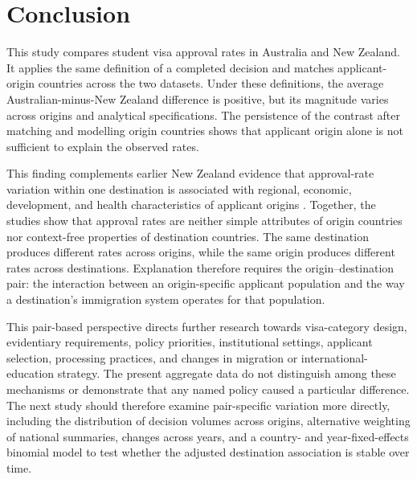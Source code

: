 \documentclass[runningheads]{llncs}
\begin{document}
\section{Conclusion}

This study compares student visa approval rates in Australia and New Zealand. It applies the same definition of a completed decision and matches applicant-origin countries across the two datasets. Under these definitions, the average Australian-minus-New Zealand difference is positive, but its magnitude varies across origins and analytical specifications. The persistence of the contrast after matching and modelling origin countries shows that applicant origin alone is not sufficient to explain the observed rates.

This finding complements earlier New Zealand evidence that approval-rate variation within one destination is associated with regional, economic, development, and health characteristics of applicant origins \cite{Kaplan2026NZVisaApproval}. Together, the studies show that approval rates are neither simple attributes of origin countries nor context-free properties of destination countries. The same destination produces different rates across origins, while the same origin produces different rates across destinations. Explanation therefore requires the origin--destination pair: the interaction between an origin-specific applicant population and the way a destination's immigration system operates for that population.

This pair-based perspective directs further research towards visa-category design, evidentiary requirements, policy priorities, institutional settings, applicant selection, processing practices, and changes in migration or international-education strategy. The present aggregate data do not distinguish among these mechanisms or demonstrate that any named policy caused a particular difference. The next study should therefore examine pair-specific variation more directly, including the distribution of decision volumes across origins, alternative weighting of national summaries, changes across years, and a country- and year-fixed-effects binomial model to test whether the adjusted destination association is stable over time.



\end{document}
